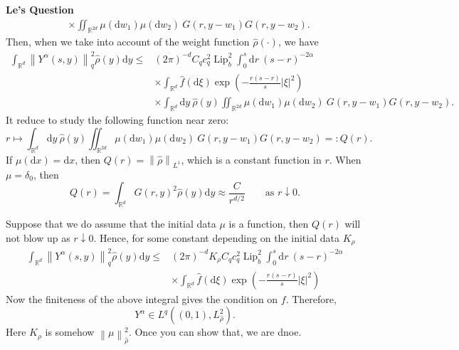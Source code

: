 \documentclass[a4paper,11pt]{article}
\theoremstyle{plain}
\theoremstyle{definition}
\newcommand{\ud}{\ensuremath{\mathrm{d}}}
\newcommand{\Norm}[1]{\left\|  #1   \right\|}
\newcommand{\R}{\mathbb{R}}
\DeclareMathOperator{\LIP}{Lip}
\newcounter{LQ}
\newenvironment{LeQuestion}[1][] %
  {\refstepcounter{LQ}
  \begin{mdframed}[backgroundcolor=red!10]\textbf{Le's Question \theLQ \: #1~~}~~~\noindent}%
  {\end{mdframed}}
\numberwithin{NQ}{section}
\numberwithin{LQ}{section}
\numberwithin{ZQ}{section}
\begin{document}
\begin{LeQuestion}
\begin{align*}
&\times \iint_{\R^{2d}}\mu(\ud  w_1) \mu(\ud w_2)\:  G(r,y-w_1)G(r,y-w_2).
\end{align*}
Then, when we take into account of the weight function $\hat{\rho}(\cdot)$, we have 
\begin{align}
\int_{\R^d}\Norm{Y^{\alpha}(s,y)}_q^2 \hat{\rho}(y)\ud y \le & (2\pi)^{-d} C_q c_q^2\LIP_b^2 \int_0^s \ud r \: (s-r)^{-2\alpha} \\
&\times \int_{\R^{d}} \hat{f}(\ud \xi) \exp\left(-\frac{r(s-r)}{s}|\xi|^2\right)\\
&\times \int_{\R^d}\ud y \: \hat{\rho}(y) \iint_{\R^{2d}}\mu(\ud  w_1) \mu(\ud w_2)\:  G(r,y-w_1)G(r,y-w_2).
\end{align}
It reduce to study the following function near zero: 
\[
r\mapsto \int_{\R^d}\ud y \: \hat{\rho}(y) \iint_{\R^{2d}}\mu(\ud  w_1) \mu(\ud w_2)\:  G(r,y-w_1)G(r,y-w_2) =:Q(r).
\]
If $\mu(\ud x)=\ud x$, then  $Q(r) = \Norm{\hat{\rho}}_{L^1}$, which is a constant function in $r$.
When $\mu=\delta_0$, then 
\[
Q(r) = \int_{\R^d } G(r,y)^2 \hat{\rho}(y)\ud y \approx \frac{C}{r^{d/2}} \qquad \text{as $r\downarrow 0$}.
\]

Suppose that we do assume that the initial data $\mu$ is a function, then $Q(r)$ will not blow up as $r\downarrow 0$. Hence, for some constant depending on the initial data $K_\rho$
\begin{align}
\int_{\R^d}\Norm{Y^{\alpha}(s,y)}_q^2 \hat{\rho}(y)\ud y \le & (2\pi)^{-d} K_\rho C_q c_q^2\LIP_b^2 \int_0^s \ud r \: (s-r)^{-2\alpha} \\
&\times \int_{\R^{d}} \hat{f}(\ud \xi) \exp\left(-\frac{r(s-r)}{s}|\xi|^2\right)
\end{align}
Now the finiteness of the above integral gives the condition on $f$. Therefore, 
\[
Y^\alpha \in L^q((0,1),L^2_{\hat{\rho}}).
\]
Here $K_\rho$ is somehow $\Norm{\mu}_{\hat{\rho}}^2$. Once you can show that, we are dnoe. 
\end{LeQuestion}
\end{document}
